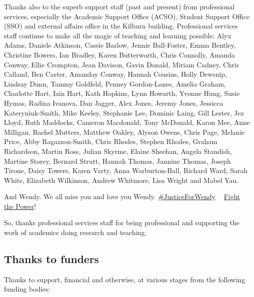 \documentclass[
]{book}
\begin{document}
Thanks also to the superb support staff (past and present) from professional services, especially the Academic Support Office (ACSO), Student Support Office (SSO) and external affairs office in the Kilburn building. Professional services staff continue to make all the magic of teaching and learning possible: Alyx Adams, Daniele Atkinson, Cassie Barlow, Jennie Ball-Foster, Emma Bentley, Christine Bowers, Ian Bradley, Karen Butterworth, Chris Connolly, Amanda Conway, Ellie Crompton, Jean Davison, Gavin Donald, Miriam Cadney, Chris Calland, Ben Carter, Amanday Conway, Hannah Cousins, Holly Dewsnip, Lindsay Dunn, Tammy Goldfeld, Penney Gordon-Lanes, Amelia Graham, Charlotte Hart, Iain Hart, Kath Hopkins, Lynn Howarth, Yvonne Hung, Susie Hymas, Radina Ivanova, Dan Jagger, Alex Jones, Jeremy Jones, Jessicca Kateryniuk-Smith, Mike Keeley, Stephanie Lee, Dominic Laing, Gill Lester, Jez Lloyd, Ruth Maddocks, Cameron Macdonald, Tony McDonald, Karon Mee, Anne Milligan, Rachel Mutters, Matthew Oakley, Alyson Owens, Chris Page, Melanie Price, Abby Ragazzon-Smith, Chris Rhodes, Stephen Rhodes, Graham Richardson, Martin Ross, Julian Skyrme, Elaine Sheehan, Angela Standish, Martine Storey, Bernard Strutt, Hannah Thomas, Jannine Thomas, Joseph Tirone, Daisy Towers, Karen Varty, Anna Warburton-Ball, Richard Ward, Sarah White, Elizabeth Wilkinson, Andrew Whitmore, Lisa Wright and Mabel Yau.

And Wendy. We all miss you and love you Wendy. \href{https://www.justgiving.com/crowdfunding/byte-cafe}{\#JusticeForWendy} ✊🏽 \href{https://en.wikipedia.org/wiki/Fight_the_Power_(Public_Enemy_song)}{Fight the Power}! ✊🏽 \citep{fightthepower}

So, thanks professional services staff for being professional and supporting the work of academics doing research and teaching. 🙏

\hypertarget{funding}{%
\subsection{Thanks to funders}\label{funding}}

Thanks to support, financial and otherwise, at various stages from the following funding bodies:
\end{document}
